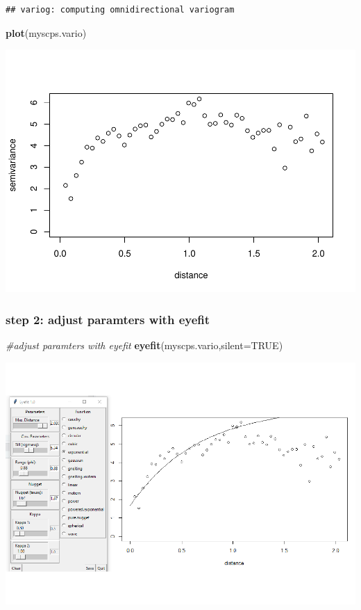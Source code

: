 \documentclass[]{article}
\newenvironment{Shaded}{\begin{snugshade}}{\end{snugshade}}
\newcommand{\KeywordTok}[1]{\textcolor[rgb]{0.13,0.29,0.53}{\textbf{#1}}}
\newcommand{\DataTypeTok}[1]{\textcolor[rgb]{0.13,0.29,0.53}{#1}}
\newcommand{\CommentTok}[1]{\textcolor[rgb]{0.56,0.35,0.01}{\textit{#1}}}
\newcommand{\OtherTok}[1]{\textcolor[rgb]{0.56,0.35,0.01}{#1}}
\newcommand{\NormalTok}[1]{#1}
\begin{document}
\begin{verbatim}
## variog: computing omnidirectional variogram
\end{verbatim}

\begin{Shaded}
\begin{Highlighting}[]
\KeywordTok{plot}\NormalTok{(myscps.vario)}
\end{Highlighting}
\end{Shaded}

\includegraphics{Homework3_files/figure-latex/6x_vario-1.pdf}

\subsubsection{step 2: adjust paramters with
eyefit}\label{step-2-adjust-paramters-with-eyefit}

\begin{Shaded}
\begin{Highlighting}[]
\CommentTok{#adjust paramters with eyefit}
\KeywordTok{eyefit}\NormalTok{(myscps.vario,}\DataTypeTok{silent=}\OtherTok{TRUE}\NormalTok{)}
\end{Highlighting}
\end{Shaded}

\includegraphics{Homework3_files/figure-latex/ex6_3dd-1.pdf}
\end{document}
